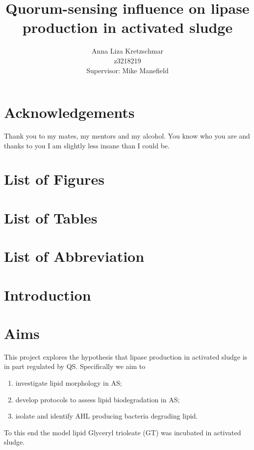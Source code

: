 \documentclass{article}
\title{\textbf{Quorum-sensing influence on lipase production in activated sludge}}
\author{Anna Liza Kretzschmar\\
        z3218219\\
        Supervisor: Mike Manefield}
\date{}
\begin{document}
\maketitle

\tableofcontents

\newpage


\section{Acknowledgements}
Thank you to my mates, my mentors and my alcohol. You know who you are and thanks to you I am slightly less insane than I could be.
\newpage
\section{List of Figures}

\newpage
\section{List of Tables}

\newpage
\section{List of Abbreviation}

%

\newpage
\section{Introduction}

%

\section{Aims}
This project explores the hypothesis that lipase production in activated sludge is in part regulated by QS. Specifically we aim to

\begin{enumerate}
\item investigate lipid morphology in AS;
\item develop protocols to assess lipid biodegradation in AS;
\item isolate and identify AHL producing bacteria degrading lipid.
\end{enumerate}
To this end the model lipid Glyceryl trioleate (GT) was incubated in activated sludge.
\end{document}
